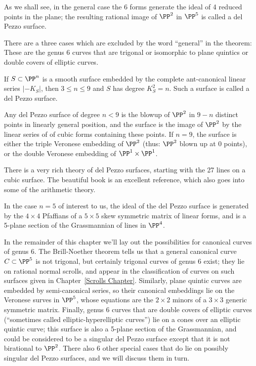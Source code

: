 As we shall see, in the general case the 6 forms generate the ideal of 4 reduced points in the plane; the resulting rational
image of $\PP^2$ in $\PP^5$ is called a del Pezzo surface. 

There are a three cases which are excluded by the word ``general'' in the theorem:
These are the genus 6 curves that are trigonal or isomorphic to plane quintics
or double covers of elliptic curves. 

\begin{fact}
If $S\subset \PP^n$ is a smooth surface embedded by the complete ant-canonical linear series $|-K_S|$, then
$3\leq n\leq 9$ and $S$ has degree $K_S^2 = n$. Such a surface is called a 
del Pezzo surface.

Any del Pezzo surface of degree $n<9$ is the blowup of $\PP^2$
in $9-n$ distinct points in linearly general position, 
and the surface is the image of $\PP^2$ by  the linear series of of cubic forms containing these points. If $n=9$, the surface
is either the triple Veronese embedding of $\PP^2$ (thus: $\PP^2$ blown up at 0 points), or the double Veronese embedding of
$\PP^1\times \PP^1$.  

There is a very rich theory of del Pezzo surfaces, starting with the 27 lines on a cubic surface. The
beautiful book \cite{Manin} is an excellent reference, which also goes into some of the arithmetic theory.

In the case $n=5$ of interest to us, the ideal of the del Pezzo surface 
is generated by the $4\times 4$ Pfaffians of a $5\times 5$ skew symmetric matrix of linear forms, and is a 5-plane section of the Grassmannian of lines in $\PP^4$.
\end{fact}

In the remainder of this chapter we'll lay out the possibilities for canonical curves of genus 6. The Brill-Noether theorem tells us that a general canonical curve $C \subset \PP^5$ is not trigonal, but certainly trigonal curves of genus 6 exist; they lie on rational normal scrolls, and appear in the classification of curves on such surfaces given in Chapter~\ref{Scrolls Chapter}. Similarly, plane quintic curves
are embedded by semi-canonical series, so their canonical embeddings lie on the Veronese
surves in $\PP^5$, whose equations are the $2\times 2$ minors of a $3\times 3$ generic symmetric matrix.
Finally, genus 6 curves that are double covers of elliptic curves (``sometimes called elliptic-hyperelliptic curves'') lie on a cones over an elliptic quintic curve; this surface is also a 5-plane section of the Grassmannian, and could be considered to be a singular del Pezzo surface except that it is not birational to $\PP^2$.
There also 6 other special cases that do lie on possibly singular del Pezzo surfaces, and we will discuss them in turn.


